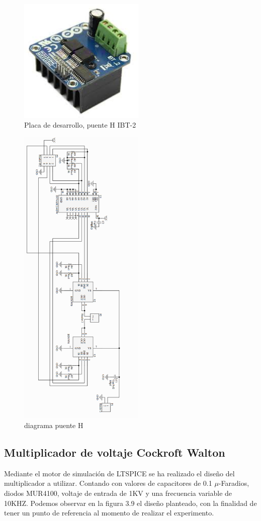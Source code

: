 \begin{figure}[H]
\centering
\includegraphics[width=6cm]{Capitulo3/figs/bts.jpg}
\caption{Placa de desarrollo, puente H IBT-2}
\end{figure}

\begin{figure}[H]
\centering
\includegraphics[width=6cm]{Capitulo3/figs/ibt2.png}
\caption{diagrama puente H}
\end{figure}



\newpage


\subsection{Multiplicador de voltaje Cockroft Walton}
Mediante el motor de simulación de LTSPICE se ha realizado el diseño del multiplicador a utilizar. Contando con valores de capacitores de 0.1 $\mu$-Faradios, diodos MUR4100, voltaje de entrada de 1KV y una frecuencia variable de 10KHZ. Podemos observar en la figura 3.9 el diseño planteado, con la finalidad de tener un punto de referencia al momento de realizar el experimento. \\

